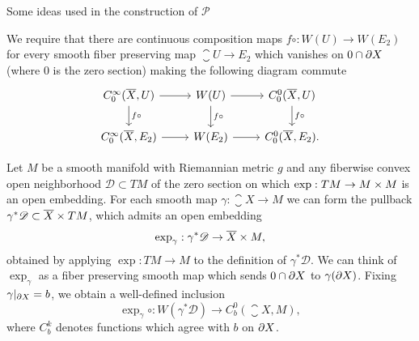 \documentclass{amsart}
\begin{document}
\begin{clear}{Some ideas used in the construction of $\mathscr{P}$}
\begin{defn}
  We require that there are continuous composition maps $f\circ :W(U)\to W(E_{2})$ for every smooth fiber preserving map $\closure{U}\to E_{2}$ which vanishes on $0\cap \partial X$ (where $0$ is the zero section) making the following diagram commute
  \begin{equation*}
    \begin{tikzcd}
      C^{\infty}_{0}(\closure{X},U)\arrow[r]\arrow[d,"f\circ"]& W(U)\arrow[r]\arrow[d,"f\circ"]& C^{0}_{0}(\closure{X},U)\arrow[d,"f\circ "]\\
      C^{\infty}_{0}(\closure{X},E_{2})\arrow[r]& W(E_{2})\arrow[r]& C^{0}_{0}(\closure{X},E_{2}).
    \end{tikzcd}
  \end{equation*}
\end{defn}
\begin{defn}
  Let $M$ be a smooth manifold with Riemannian metric $g$ and any fiberwise convex open neighborhood $\mathscr{D}\subset TM$ of the zero section on which $\exp:TM\to M\times M$ is an open embedding. For each smooth map $\gamma:\closure{X}\to M$ we can form the pullback $\gamma^{*}\mathscr{D}\subset \overline{X}\times TM$, which admits an open embedding
  \begin{equation*}
    \exp_{\gamma}:\gamma^{*}\mathscr{D}\to \overline{X}\times M,
  \end{equation*}
  obtained by applying $\exp:TM\to M$ to the definition of $\gamma^{*}\mathscr{D}$. We can think of $\exp_{\gamma}$ as a fiber preserving smooth map which sends $0\cap \partial X$ to $\gamma(\partial X)$. Fixing $\gamma|_{\partial X}=b$, we obtain a well-defined inclusion
  \begin{equation*}
    \exp_{\gamma}\circ:W(\gamma^{*}\mathscr{D})\to C^{0}_{b}(\closure{X},M),
  \end{equation*}
  where $C^{k}_{b}$ denotes functions which agree with $b$ on $\partial
  X$.
  

\end{defn}
\end{clear}
\end{document}
